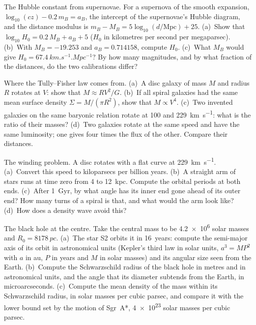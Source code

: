 \begin{exercise}[$\star\star$]\label{exo:b3:milky-way-galaxies:9}
The Hubble constant from supernovae. For a supernova of the smooth
expansion, $\log_{10}(cz) - 0.2\,m_B = a_B$, the intercept of the
supernovae's Hubble diagram, and the distance modulus is
$m_B - M_B = 5\log_{10}(d/\mathrm{Mpc}) + 25$. (a)~Show that
$\log_{10}H_0 = 0.2\,M_B + a_B + 5$ ($H_0$ in kilometres per second per
megaparsec). (b)~With $M_B = -19.253$ and $a_B = 0.714158$, compute $H_0$.
(c)~What $M_B$ would give $H_0 = \qty{67.4}{km.s^{-1}.Mpc^{-1}}$? By how
many magnitudes, and by what fraction of the distances, do the two
calibrations differ?
\end{exercise}

\begin{exercise}[$\star\star\star$]\label{exo:b3:milky-way-galaxies:10}
Where the Tully--Fisher law comes from. (a)~A disc galaxy of mass $M$
and radius $R$ rotates at $V$: show that $M \approx RV^2/G$. (b)~If all
spiral galaxies had the same mean surface density $\Sigma = M/(\pi R^2)$,
show that $M \propto V^4$. (c)~Two invented galaxies on the same baryonic
relation rotate at 100 and \qty{229}{km.s^{-1}}: what is the ratio of
their masses? (d)~Two galaxies rotate at the same speed and have the same
luminosity; one gives four times the flux of the other. Compare their
distances.
\end{exercise}

\begin{exercise}[$\star\star\star$]\label{exo:b3:milky-way-galaxies:11}
The winding problem. A disc rotates with a flat curve at
\qty{229}{km.s^{-1}}. (a)~Convert this speed to kiloparsecs per billion
years. (b)~A straight arm of stars runs at time zero from 4 to
\qty{12}{kpc}. Compute the orbital periods at both ends. (c)~After
\qty{1}{Gyr}, by what angle has its inner end gone ahead of its outer
end? How many turns of a spiral is that, and what would the arm look
like? (d)~How does a density wave avoid this?
\end{exercise}

\begin{exercise}[$\star\star\star$]\label{exo:b3:milky-way-galaxies:12}
The black hole at the centre. Take the central mass to be
\num{4.2e6} solar masses and $R_0 = \qty{8178}{pc}$. (a)~The star S2
orbits it in \num{16}~years: compute the semi-major axis of its orbit in
astronomical units (Kepler's third law in solar units, $a^3 = MP^2$ with
$a$ in au, $P$ in years and $M$ in solar masses) and its angular size seen
from the Earth. (b)~Compute the Schwarzschild radius of the black hole in
metres and in astronomical units, and the angle that its diameter
subtends from the Earth, in microarcseconds. (c)~Compute the mean density
of the mass within its Schwarzschild radius, in solar masses per cubic
parsec, and compare it with the lower bound set by the motion of Sgr~A*,
\num{4e23} solar masses per cubic parsec.
\end{exercise}

